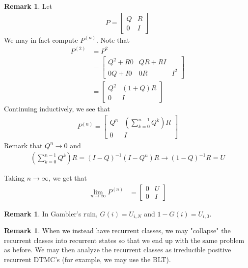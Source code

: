 \documentclass[11pt]{amsart}
\theoremstyle{definition}
\newtheorem{remark}[theorem]{Remark}
\numberwithin{equation}{section}
\begin{document}
 \begin{remark}
     Let
     \begin{align*}
         P=\begin{bmatrix}
             Q & R\\
             0 & I
         \end{bmatrix}
     \end{align*}
     We may in fact compute $P^{(n)}$. Note that
     \begin{align*}
         P^{(2)}&=P^2\\
         &=\begin{bmatrix}
             Q^2+R0 & QR+RI\\
             0Q+I0 & 0R & I^2
         \end{bmatrix}\\
         &=\begin{bmatrix}
             Q^2 & (1+Q)R\\
             0 & I
         \end{bmatrix}
     \end{align*}
     Continuing inductively, we see that
     \begin{align*}
         P^{(n)}=\begin{bmatrix}
             Q^n & \left(\sum_{k=0}^{n-1}Q^k\right)R\\
             0 & I
         \end{bmatrix}
     \end{align*}
     Remark that $Q^n\to 0$ and 
     \begin{align*}
         \left(\sum_{k=0}^{n-1}Q^k\right)R=(I-Q)^{-1}(I-Q^n)R\to(1-Q)^{-1}R=U
     \end{align*}
     
     Taking $n\to\infty$, we get that
     \begin{align*}
         \lim_{n\to\infty}P^{(n)}&=\begin{bmatrix}
             0 & U\\
             0 & I
         \end{bmatrix}
     \end{align*}
 \end{remark}
 \begin{remark}
     In Gambler's ruin, $G(i)=U_{i,N}$ and $1-G(i)=U_{i,0}$.
 \end{remark}
 \begin{remark}
     When we instead have recurrent classes, we may "collapse" the recurrent classes into recurrent states so that we end up with the same problem as before. We may then analyze the recurrent classes as irreducible positive recurrent DTMC's (for example, we may use the BLT).
 \end{remark}
\end{document}
